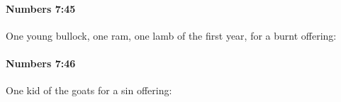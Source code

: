 		\paragraph{Numbers 7:45} %
			\label{NUMBERS-7-45}

			One young bullock, one ram, one lamb of the first year, for a burnt offering:


		\paragraph{Numbers 7:46} %
			\label{NUMBERS-7-46}

			One kid of the goats for a sin offering:


